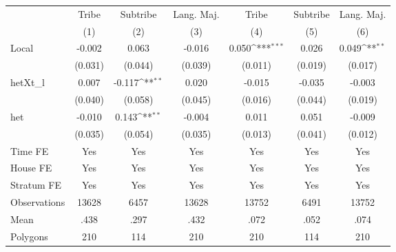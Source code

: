 {
\def\sym#1{\ifmmode^{#1}\else\(^{#1}\)\fi}
\begin{tabular}{l*{6}{c}}
\hline\hline
                &\multicolumn{1}{c}{Tribe}&\multicolumn{1}{c}{Subtribe}&\multicolumn{1}{c}{Lang. Maj.}&\multicolumn{1}{c}{Tribe}&\multicolumn{1}{c}{Subtribe}&\multicolumn{1}{c}{Lang. Maj.}\\
                &\multicolumn{1}{c}{(1)}         &\multicolumn{1}{c}{(2)}         &\multicolumn{1}{c}{(3)}         &\multicolumn{1}{c}{(4)}         &\multicolumn{1}{c}{(5)}         &\multicolumn{1}{c}{(6)}         \\
\hline
Local           &   -0.002         &    0.063         &   -0.016         &    0.050\sym{***}&    0.026         &    0.049\sym{**} \\
                &  (0.031)         &  (0.044)         &  (0.039)         &  (0.011)         &  (0.019)         &  (0.017)         \\
hetXt\_l         &    0.007         &   -0.117\sym{**} &    0.020         &   -0.015         &   -0.035         &   -0.003         \\
                &  (0.040)         &  (0.058)         &  (0.045)         &  (0.016)         &  (0.044)         &  (0.019)         \\
het             &   -0.010         &    0.143\sym{**} &   -0.004         &    0.011         &    0.051         &   -0.009         \\
                &  (0.035)         &  (0.054)         &  (0.035)         &  (0.013)         &  (0.041)         &  (0.012)         \\
Time FE         &      Yes         &      Yes         &      Yes         &      Yes         &      Yes         &      Yes         \\
House FE        &      Yes         &      Yes         &      Yes         &      Yes         &      Yes         &      Yes         \\
Stratum FE      &      Yes         &      Yes         &      Yes         &      Yes         &      Yes         &      Yes         \\
\hline
Observations    &    13628         &     6457         &    13628         &    13752         &     6491         &    13752         \\
Mean            &     .438         &     .297         &     .432         &     .072         &     .052         &     .074         \\
Polygons        &      210         &      114         &      210         &      210         &      114         &      210         \\
\hline\hline
\end{tabular}
}
